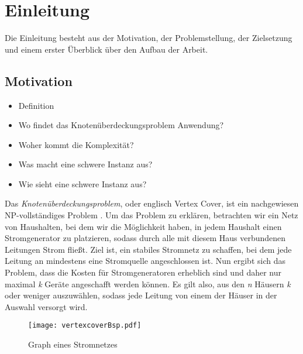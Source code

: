 
\chapter{Einleitung}
\label{ch:Einleitung}
Die Einleitung besteht aus der Motivation, der Problemstellung, der Zielsetzung und einem erster Überblick über den Aufbau der Arbeit.

\section{Motivation}
\label{ch:Einleitung:sec:Motivation}

\begin{itemize}
\item Definition
\item Wo findet das Knotenüberdeckungsproblem Anwendung?
\item Woher kommt die Komplexität?
\item Was macht eine schwere Instanz aus?
\item Wie sieht eine schwere Instanz aus?
\end{itemize}
Das \emph{Knotenüberdeckungsproblem}, oder englisch Vertex Cover, ist ein nachgewiesen NP-vollständiges Problem \cite{intract}. Um das Problem zu erklären, betrachten wir ein Netz von Haushalten, bei dem wir die Möglichkeit haben, in jedem Haushalt einen Stromgenerator zu platzieren, sodass durch alle mit diesem Haus verbundenen Leitungen Strom fließt. Ziel ist, ein stabiles Stromnetz zu schaffen, bei dem jede Leitung an mindestens eine Stromquelle angeschlossen ist. Nun ergibt sich das Problem, dass die Kosten für Stromgeneratoren erheblich sind und daher nur maximal \emph{k} Geräte angeschafft werden können. Es gilt also, aus den \emph{n} Häusern \emph{k} oder weniger auszuwählen, sodass jede Leitung von einem der Häuser in der Auswahl versorgt wird. 
\begin{figure}[htb]
\centering
  	{\texttt{[image: vertexcoverBsp.pdf]}}
	\caption{Graph eines Stromnetzes \label{fig:vc}}
\centering
\end{figure}
